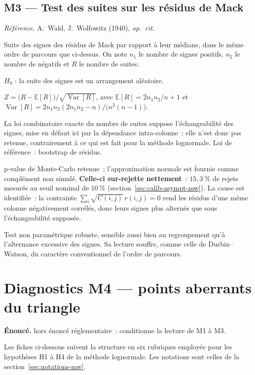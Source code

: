 \documentclass[a4paper,11pt]{article}
\newcommand{\refl}[1]{{\small\textcolor{maincolor!70!black}{\textit{Référence.} #1}}\par\smallskip}
\newcounter{ficheid}
\newenvironment{fiche}[1]{%
  \stepcounter{ficheid}%
  \phantomsection
  \subsection{#1}%
  \label{fiche:\theficheid}%
}{%
  \end{description}\vspace{0.5em}%
}
\newcommand{\Cadre}{%
  \begin{description}[leftmargin=0pt, style=unboxed, itemsep=3pt, topsep=3pt, parsep=2pt]%
  \item[\textcolor{financeblue}{\textbf{1. Cadre, notations et hypothèses de validité (non testées).}}]}
\newcommand{\Hzero}{\item[\textcolor{financeblue}{\textbf{2. Hypothèse nulle.}}]}
\newcommand{\Stat}{\item[\textcolor{financeblue}{\textbf{3. Statistique de test.}}]}
\newcommand{\Loi}{\item[\textcolor{financeblue}{\textbf{4. Loi sous $H_0$.}}]}
\newcommand{\Pval}{\item[\textcolor{financeblue}{\textbf{5. p-value.}}]}
\newcommand{\Usage}{\item[\textcolor{financeblue}{\textbf{6. Usage et limites.}}]}
\begin{document}
\begin{fiche}{M3 --- Test des suites sur les résidus de Mack}
\label{mw:m3runs}
\refl{A.~Wald, J.~Wolfowitz (1940), \emph{op.\ cit.}}
\Cadre
Suite des signes des résidus de Mack par rapport à leur médiane, dans le même
ordre de parcours que ci-dessus. On note $n_1$ le nombre de signes positifs,
$n_2$ le nombre de négatifs et $R$ le nombre de suites.
\Hzero
$H_0$ : la suite des signes est un arrangement aléatoire.
\Stat
$Z = \big(R - \mathbb{E}[R]\big)/\sqrt{\operatorname{Var}[R]}$, avec
$\mathbb{E}[R] = 2n_1n_2/n + 1$ et
$\operatorname{Var}[R] = 2n_1n_2(2n_1n_2-n)/\big(n^2(n-1)\big)$.
\Loi
La loi combinatoire exacte du nombre de suites suppose l'échangeabilité des
signes, mise en défaut ici par la dépendance intra-colonne~: elle n'est donc pas
retenue, contrairement à ce qui est fait pour la méthode lognormale. Loi de
référence~: bootstrap de résidus.
\Pval
p-value de Monte-Carlo retenue~; l'approximation normale est fournie comme
complément non simulé. \textbf{Celle-ci sur-rejette nettement}~: $15{,}3~\%$ de
rejets mesurés au seuil nominal de $10~\%$ (section~\ref{sec:calib-asympt-mw}).
La cause est identifiée~: la contrainte
$\sum_i \sqrt{C(i,j)}\,r(i,j) = 0$ rend les résidus d'une même colonne
négativement corrélés, donc leurs signes plus alternés que sous l'échangeabilité
supposée.
\Usage
Test non paramétrique robuste, sensible aussi bien au regroupement qu'à
l'alternance excessive des signes. Sa lecture souffre, comme celle de
Durbin--Watson, du caractère conventionnel de l'ordre de parcours.
\end{fiche}

\clearpage
\section{Diagnostics M4 --- points aberrants du triangle}
\label{sec:mwm4}

\begin{encadre}
\textbf{Énoncé.} hors énoncé réglementaire~: conditionne la lecture de M1 à M3.
\end{encadre}

Les fiches ci-dessous suivent la structure en six rubriques employée pour les
hypothèses H1 à H4 de la méthode lognormale. Les notations sont celles de la
section~\ref{sec:notations-mw}.
\end{document}

